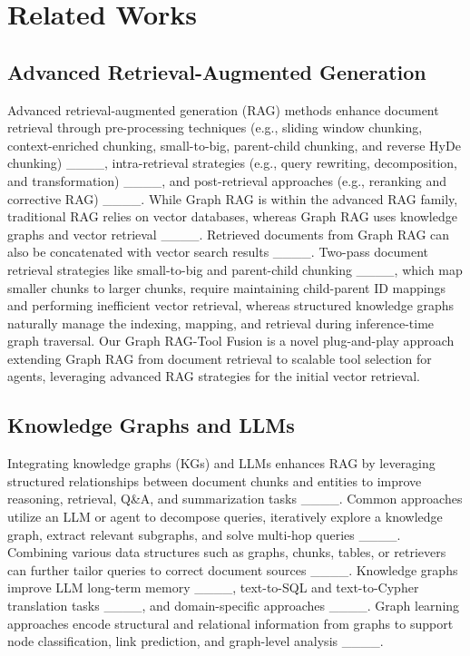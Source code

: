 \section{Related Works}
\subsection{Advanced Retrieval-Augmented Generation}
Advanced retrieval-augmented generation (RAG) methods enhance document retrieval through pre-processing techniques (e.g., sliding window chunking, context-enriched chunking, small-to-big, parent-child chunking, and reverse HyDe chunking) ____, intra-retrieval strategies (e.g., query rewriting, decomposition, and transformation) ____, and post-retrieval approaches (e.g., reranking and corrective RAG) ____. While Graph RAG is within the advanced RAG family, traditional RAG relies on vector databases, whereas Graph RAG uses knowledge graphs and vector retrieval ____. Retrieved documents from Graph RAG can also be concatenated with vector search results ____. Two-pass document retrieval strategies like small-to-big and parent-child chunking ____, which map smaller chunks to larger chunks, require maintaining child-parent ID mappings and performing inefficient vector retrieval, whereas structured knowledge graphs naturally manage the indexing, mapping, and retrieval during inference-time graph traversal. Our Graph RAG-Tool Fusion is a novel plug-and-play approach extending Graph RAG from document retrieval to scalable tool selection for agents, leveraging advanced RAG strategies for the initial vector retrieval.

\subsection{Knowledge Graphs and LLMs} Integrating knowledge graphs (KGs) and LLMs enhances RAG by leveraging structured relationships between document chunks and entities to improve reasoning, retrieval, Q\&A, and summarization tasks ____. Common approaches utilize an LLM or agent to decompose queries, iteratively explore a knowledge graph, extract relevant subgraphs, and solve multi-hop queries ____. Combining various data structures such as graphs, chunks, tables, or retrievers can further tailor queries to correct document sources ____. Knowledge graphs improve LLM long-term memory ____, text-to-SQL and text-to-Cypher translation tasks ____, and domain-specific approaches ____. Graph learning approaches encode structural and relational information from graphs to support node classification, link prediction, and graph-level analysis ____.

